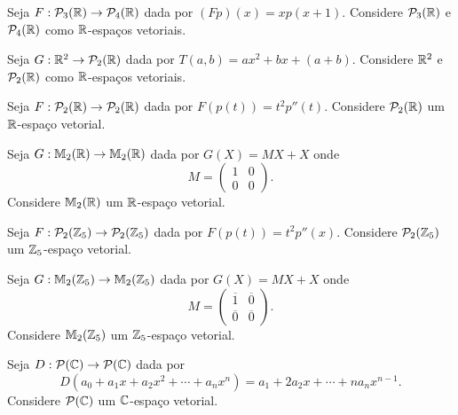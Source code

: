 \documentclass[12pt]{exam}
\begin{document}
\begin{exercicio}
	Seja $F : \mathcal{P}_3(\mathbb{R}) \to \mathcal{P}_4(\mathbb{R})$ dada por $(Fp)(x) = xp(x + 1)$. Considere $\mathcal{P}_3(\mathbb{R})$ e $\mathcal{P}_4(\mathbb{R})$ como $\mathbb{R}$-espa\c{c}os vetoriais.
\end{exercicio}

\begin{exercicio}
	Seja $G : \mathbb{R}^2 \to \mathcal{P}_2(\mathbb{R})$ dada por $T(a,b) = ax^2 + bx + (a + b)$. Considere $\mathbb{R}^2$ e $\mathcal{P}_2(\mathbb{R})$ como $\mathbb{R}$-espa\c{c}os vetoriais.
\end{exercicio}

\begin{exercicio}
	Seja $F : \mathcal{P}_2(\mathbb{R}) \to \mathcal{P}_2(\mathbb{R})$ dada por $F(p(t)) = t^2p''(t)$. Considere $\mathcal{P}_2(\mathbb{R})$ um $\mathbb{R}$-espa\c{c}o vetorial.
\end{exercicio}

\begin{exercicio}
	Seja $G : \mathbb{M}_2(\mathbb{R}) \to \mathbb{M}_2(\mathbb{R})$ dada por $G(X) = MX + X$ onde
	\[
	M = \begin{pmatrix}
		1 & 0\\
		0 & 0
	\end{pmatrix}.
	\]
	Considere $\mathbb{M}_2(\mathbb{R})$ um $\mathbb{R}$-espa\c{c}o vetorial.
\end{exercicio}


\begin{exercicio}
	Seja $F : \mathcal{P}_2(\mathbb{Z}_5) \to \mathcal{P}_2(\mathbb{Z}_5)$ dada por $F(p(t)) = t^2p''(x)$. Considere $\mathcal{P}_2(\mathbb{Z}_5)$ um $\mathbb{Z}_5$-espa\c{c}o vetorial.
\end{exercicio}

\begin{exercicio}
	Seja $G : \mathbb{M}_2(\mathbb{Z}_5) \to \mathbb{M}_2(\mathbb{Z}_5)$ dada por $G(X) = MX + X$ onde
	\[
	M = \begin{pmatrix}
		\overline{1} & \overline{0}\\
		\overline{0} & \overline{0}
	\end{pmatrix}.
	\]
	Considere $\mathbb{M}_2(\mathbb{Z}_5)$ um $\mathbb{Z}_5$-espa\c{c}o vetorial.
\end{exercicio}

\begin{exercicio}
	Seja $D : \mathcal{P}(\mathbb{C}) \to \mathcal{P}(\mathbb{C})$ dada por
	\[
	D(a_0 + a_1x + a_2x^2 + \cdots + a_nx^n) = a_1 + 2a_2x + \cdots + na_nx^{n - 1}.
	\]
	Considere $\mathcal{P}(\mathbb{C})$ um $\mathbb{C}$-espa\c{c}o vetorial.
\end{exercicio}
\end{document}

